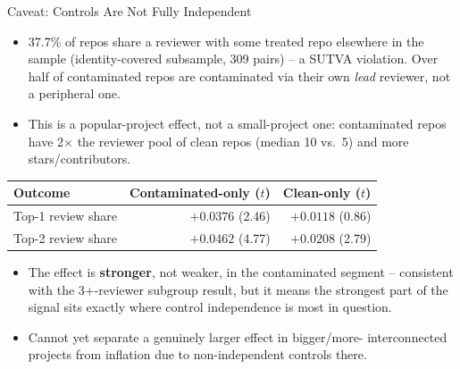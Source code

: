 \begin{frame}{Caveat: Controls Are Not Fully Independent}
\begin{itemize}
  \item 37.7\% of repos share a reviewer with some treated repo
        elsewhere in the sample (identity-covered subsample, 309 pairs)
        -- a SUTVA violation. Over half of contaminated repos are
        contaminated via their own \emph{lead} reviewer, not a
        peripheral one.
  \item This is a popular-project effect, not a small-project one:
        contaminated repos have 2$\times$ the reviewer pool of clean
        repos (median 10 vs.\ 5) and more stars/contributors.
\end{itemize}
\begin{table}
\centering
\small
\begin{tabular}{lrr}
\toprule
Outcome & Contaminated-only ($t$) & Clean-only ($t$) \\
\midrule
Top-1 review share & $+0.0376$ (2.46) & $+0.0118$ (0.86) \\
Top-2 review share & $+0.0462$ (4.77) & $+0.0208$ (2.79) \\
\bottomrule
\end{tabular}
\end{table}
\begin{itemize}
  \item The effect is \textbf{stronger}, not weaker, in the
        contaminated segment -- consistent with the 3+-reviewer
        subgroup result, but it means the strongest part of the signal
        sits exactly where control independence is most in question.
  \item Cannot yet separate a genuinely larger effect in bigger/more-
        interconnected projects from inflation due to non-independent
        controls there.
\end{itemize}
\end{frame}


